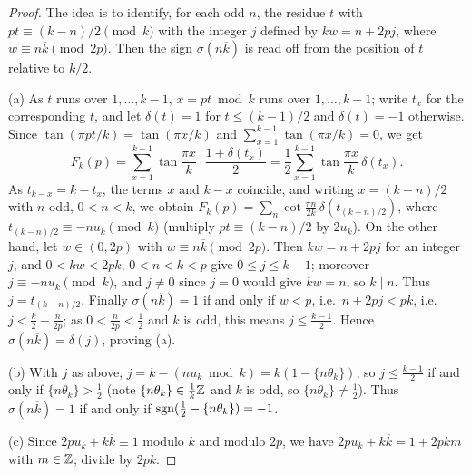 \begin{proof}
The idea is to identify, for each odd $n$, the residue $t$ with $pt\equiv(k-n)/2\pmod k$ with the integer $j$ defined by $kw=n+2pj$, where $w\equiv n\overline{k}\pmod{2p}$.
Then the sign $\sigma(n\overline{k})$ is read off from the position of $t$ relative to $k/2$.

(a) As $t$ runs over $1,\dots,k-1$, $x=pt\bmod k$ runs over $1,\dots,k-1$; write $t_x$ for the corresponding $t$, and
let $\delta(t)=1$ for $t\le(k-1)/2$ and $\delta(t)=-1$ otherwise. Since $\tan(\pi pt/k)=\tan(\pi x/k)$ and $\sum_{x=1}^{k-1}\tan(\pi x/k)=0$, we get
\[
F_k(p)=\sum_{x=1}^{k-1}\tan\frac{\pi x}k\cdot\frac{1+\delta(t_x)}{2}=\frac12\sum_{x=1}^{k-1}\tan\frac{\pi x}k\,\delta(t_x).
\]
As $t_{k-x}=k-t_x$, the terms $x$ and $k-x$ coincide, and writing $x=(k-n)/2$ with $n$ odd, $0<n<k$, we obtain
$F_k(p)=\sum_n\cot\frac{\pi n}{2k}\,\delta(t_{(k-n)/2})$, where $t_{(k-n)/2}\equiv-nu_k\pmod k$ (multiply $pt\equiv(k-n)/2$ by $2u_k$).
On the other hand,
let $w\in(0,2p)$ with $w\equiv n\overline{k}\pmod{2p}$. Then $kw=n+2pj$ for an integer $j$, and $0<kw<2pk$,
$0<n<k<p$ give $0\le j\le k-1$; moreover $j\equiv-nu_k\pmod k$, and $j\ne0$ since $j=0$ would give $kw=n$, so $k\mid n$. Thus $j=t_{(k-n)/2}$.
Finally $\sigma(n\overline{k})=1$ if and only if $w<p$, i.e.\ $n+2pj<pk$, i.e.\ $j<\frac k2-\frac n{2p}$; as
$0<\frac n{2p}<\frac12$ and $k$ is odd, this means $j\le\frac{k-1}2$. Hence $\sigma(n\overline{k})=\delta(j)$, proving (a).

(b) With $j$ as above, $j=k-(nu_k\bmod k)=k(1-\{n\theta_k\})$, so $j\le\frac{k-1}2$ if and only if
$\{n\theta_k\}>\frac12$ (note $\{n\theta_k\}\in\frac1k\mathbb{Z}$ and $k$ is odd, so $\{n\theta_k\}\neq\frac12$).
Thus $\sigma(n\overline{k})=1$ if and only if $\operatorname{sgn}(\frac12-\{n\theta_k\})=-1$.

(c) Since $2pu_k+k\overline{k}\equiv1$ modulo $k$ and modulo $2p$, we have $2pu_k+k\overline{k}=1+2pkm$ with
$m\in\mathbb{Z}$; divide by $2pk$.
\end{proof}

